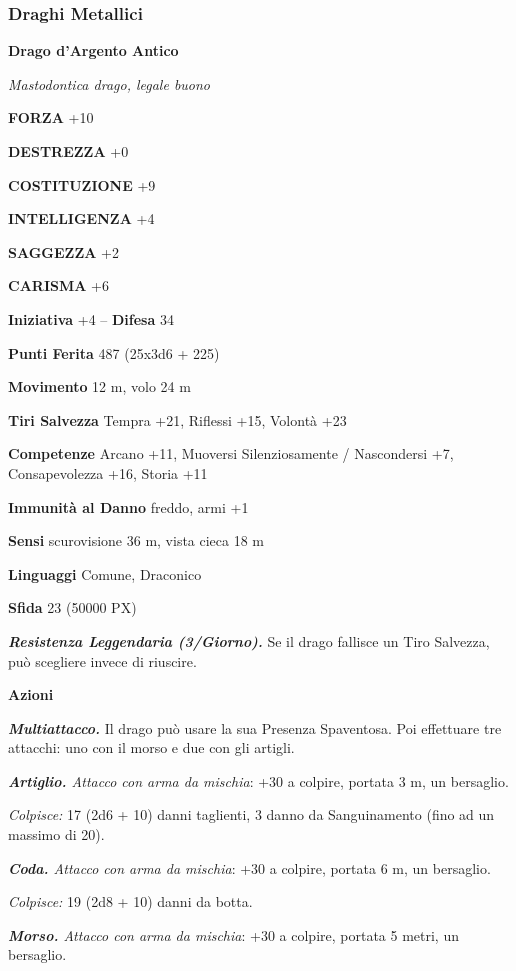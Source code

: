 \begin{multicols}{2}
\subsubsection{Draghi Metallici}

\medskip{}\textbf{Drago d'Argento Antico}

\textit{Mastodontica drago, legale buono}

\textbf{FORZA} +10

\textbf{DESTREZZA} +0

\textbf{COSTITUZIONE} +9

\textbf{INTELLIGENZA} +4

\textbf{SAGGEZZA} +2

\textbf{CARISMA} +6

\textbf{Iniziativa} +4 -- \textbf{Difesa} 34

\textbf{Punti Ferita} 487 (25x3d6 + 225)

\textbf{Movimento} 12 m, volo 24 m

\textbf{Tiri Salvezza} Tempra +21, Riflessi +15, Volontà +23

\textbf{Competenze} Arcano +11, Muoversi Silenziosamente / Nascondersi +7, Consapevolezza +16, Storia +11

\textbf{Immunità al Danno} freddo, armi +1

\textbf{Sensi} scurovisione 36 m, vista cieca 18 m

\textbf{Linguaggi} Comune, Draconico

\textbf{Sfida} 23 (50000 PX)

\textit{\textbf{Resistenza Leggendaria (3/Giorno).}} Se il drago fallisce un Tiro Salvezza, può scegliere invece di riuscire.

\textbf{Azioni}

\textit{\textbf{Multiattacco.}} Il drago può usare la sua Presenza Spaventosa. Poi effettuare tre attacchi: uno con il morso e due con gli
artigli.

\textit{\textbf{Artiglio.} Attacco con arma da mischia}: +30 a colpire, portata 3 m, un bersaglio.

\textit{Colpisce:} 17 (2d6 + 10) danni taglienti, 3 danno da Sanguinamento (fino ad un massimo di 20).

\textit{\textbf{Coda.} Attacco con arma da mischia}: +30 a colpire, portata 6 m, un bersaglio.

\textit{Colpisce:} 19 (2d8 + 10) danni da botta.

\textit{\textbf{Morso.} Attacco con arma da mischia}: +30 a colpire, portata 5 metri, un bersaglio.


\end{multicols}
